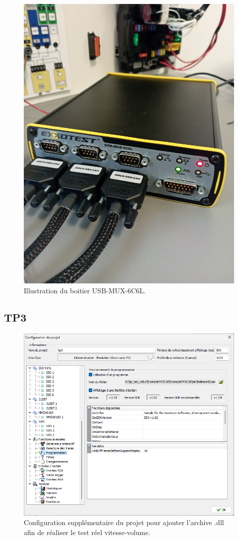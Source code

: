 \documentclass{rapportECC}
\begin{document}
\begin{figure}[H]
    \centering
    \includegraphics[width=.6\textwidth]{./images/boitier_usb.jpg}
    \caption{Illustration du boitier USB-MUX-6C6L.}
    \label{fig:boitier_usb}
\end{figure}

\subsection{TP3}\label{sec:annexeA:TP3}

\begin{figure}[H]
    \centering
    \includegraphics[width=.7\textwidth]{./images/Muxtrace_programmation_configuration_res_indus_31_01_2024_ubs_lorient_M1SESI.png}
    \caption{Configuration supplémentaire du projet pour ajouter l'archive .dll afin de réaliser le test réel vitesse-volume.}
    \label{fig:conf_additional_real_limit_vitesse}
\end{figure}
\end{document}
